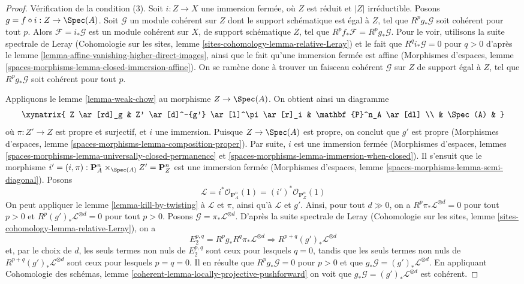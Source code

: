 \begin{proof}
\medskip\noindent
Vérification de la condition (3). Soit $i : Z \to X$ une immersion fermée,
où $Z$ est réduit et $|Z|$ irréductible. Posons $g = f \circ i : Z \to \Spec(A)$.
Soit $\mathcal{G}$ un module cohérent sur $Z$ dont le support schématique
est égal à $Z$, tel que $R^pg_*\mathcal{G}$ soit cohérent pour tout $p$.
Alors $\mathcal{F} = i_*\mathcal{G}$ est un module cohérent sur
$X$, de support schématique $Z$, tel que
$R^pf_*\mathcal{F} = R^pg_*\mathcal{G}$. Pour le voir, utilisons
la suite spectrale de Leray
(Cohomologie sur les sites, lemme \ref{sites-cohomology-lemma-relative-Leray})
et le fait que $R^qi_*\mathcal{G} = 0$ pour $q > 0$ d'après le
lemme \ref{lemma-affine-vanishing-higher-direct-images},
ainsi que le fait qu'une immersion fermée est affine
(Morphismes d'espaces, lemme
\ref{spaces-morphisms-lemma-closed-immersion-affine}).
On se ramène donc à trouver un faisceau cohérent $\mathcal{G}$ sur $Z$
de support égal à $Z$, tel que $R^pg_*\mathcal{G}$ soit cohérent
pour tout $p$.

\medskip\noindent
Appliquons le lemme \ref{lemma-weak-chow} au morphisme $Z \to \Spec(A)$.
On obtient ainsi un diagramme
$$
\xymatrix{
Z \ar[rd]_g & Z' \ar[d]^-{g'} \ar[l]^\pi \ar[r]_i & \mathbf{P}^n_A \ar[dl] \\
& \Spec(A) &
}
$$
où $\pi : Z' \to Z$ est propre et surjectif, et $i$ une immersion.
Puisque $Z \to \Spec(A)$ est propre, on conclut que $g'$ est propre
(Morphismes d'espaces, lemme \ref{spaces-morphisms-lemma-composition-proper}).
Par suite, $i$ est une immersion fermée
(Morphismes d'espaces, lemmes
\ref{spaces-morphisms-lemma-universally-closed-permanence} et
\ref{spaces-morphisms-lemma-immersion-when-closed}).
Il s'ensuit que le morphisme
$i' = (i, \pi) : \mathbf{P}^n_A \times_{\Spec(A)} Z' = \mathbf{P}^n_Z$ est
une immersion fermée
(Morphismes d'espaces, lemme \ref{spaces-morphisms-lemma-semi-diagonal}).
Posons
$$
\mathcal{L} =
i^*\mathcal{O}_{\mathbf{P}^n_A}(1) =
(i')^*\mathcal{O}_{\mathbf{P}^n_Z}(1)
$$
On peut appliquer le lemme \ref{lemma-kill-by-twisting}
à $\mathcal{L}$ et $\pi$, ainsi qu'à $\mathcal{L}$ et $g'$.
Ainsi, pour tout $d \gg 0$, on a
$R^p\pi_*\mathcal{L}^{\otimes d} = 0$ pour tout $p > 0$ et
$R^p(g')_*\mathcal{L}^{\otimes d} = 0$ pour tout $p > 0$.
Posons $\mathcal{G} = \pi_*\mathcal{L}^{\otimes d}$.
D'après la suite spectrale de Leray
(Cohomologie sur les sites, lemme \ref{sites-cohomology-lemma-relative-Leray}),
on a
$$
E_2^{p, q} = R^pg_* R^q\pi_*\mathcal{L}^{\otimes d}
\Rightarrow
R^{p + q}(g')_*\mathcal{L}^{\otimes d}
$$
et, par le choix de $d$, les seuls termes non nuls de $E_2^{p, q}$ sont
ceux pour lesquels $q = 0$, tandis que les seuls termes non nuls de
$R^{p + q}(g')_*\mathcal{L}^{\otimes d}$ sont ceux pour lesquels $p = q = 0$.
Il en résulte que $R^pg_*\mathcal{G} = 0$ pour $p > 0$ et
que $g_*\mathcal{G} = (g')_*\mathcal{L}^{\otimes d}$.
En appliquant
Cohomologie des schémas, lemme
\ref{coherent-lemma-locally-projective-pushforward}
on voit que $g_*\mathcal{G} = (g')_*\mathcal{L}^{\otimes d}$ est
cohérent.


\end{proof}
